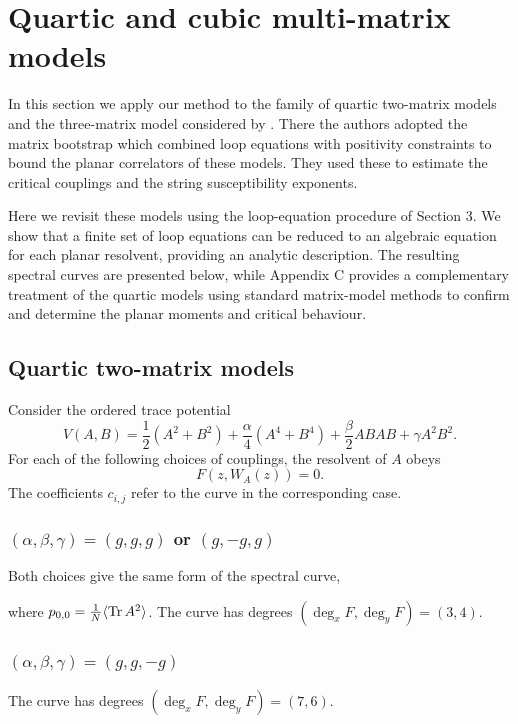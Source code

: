 \section{Quartic and cubic multi-matrix models}
\label{sec:multimatrix}

In this section we apply our method to the family of quartic two-matrix models and the three-matrix model considered by \cite{khalkhali2025bootstrappingcriticalbehaviormultimatrix}. There the authors adopted the matrix bootstrap which combined
loop equations with positivity constraints to bound the planar correlators of these models. They used these to estimate 
the critical couplings and the string susceptibility exponents.

Here we revisit these models using the loop-equation procedure of Section 3. We show that a finite set of loop equations can 
be reduced to an algebraic equation for each planar resolvent, providing an analytic description. The resulting spectral curves 
are presented below, while Appendix C provides a complementary treatment of the quartic models using standard matrix-model methods 
to confirm and determine the planar moments and critical behaviour.

\subsection{Quartic two-matrix models}
Consider the ordered trace potential
\begin{equation}
    V(A,B)=\frac12(A^2+B^2)+\frac{\alpha}{4}(A^4+B^4)
    +\frac{\beta}{2}ABAB+\gamma A^2B^2.
\end{equation}
For each of the following choices of couplings, the resolvent of $A$ obeys
\begin{equation}
    F\!\left(z,W_A(z)\right)=0.
\end{equation}
The coefficients $c_{i,j}$ refer to the curve in the corresponding case.

\subsubsection{$(\alpha,\beta,\gamma)=(g,g,g)$ or $(g,-g,g)$}
Both choices give the same form of the spectral curve,

where $p_{0,0}=\frac{1}{N}\langle\mathop{\mathrm{Tr}}\nolimits A^2\rangle$. The curve has degrees $(\deg_xF,\deg_yF)=(3,4)$.

\subsubsection{$(\alpha,\beta,\gamma)=(g,g,-g)$}

The curve has degrees $(\deg_xF,\deg_yF)=(7,6)$.

